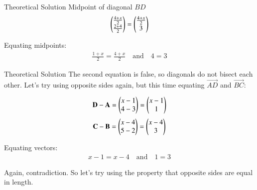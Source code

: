 \documentclass{beamer}
\begin{document}
\begin{frame}{Theoretical Solution}
Midpoint of diagonal $BD$
\begin{align}
\begin{pmatrix}\frac{4 + x}{2} \\ \frac{2 + 4}{2} \end{pmatrix} = \begin{pmatrix} \frac{4 + x}{2}\\ 3 \end{pmatrix}
\end{align}

Equating midpoints:
\begin{align}
\frac{1 + x}{2} = \frac{4 + x}{2} \quad \text{and} \quad 4 = 3
\end{align}
\end{frame}
\begin{frame}{Theoretical Solution}
The second equation is false, so diagonals do not bisect each other. Let's try using opposite sides again, but this time equating $ \vec{AD} $ and $ \vec{BC} $:

\begin{align}
\vec{D} -\vec{A} = \begin{myvec}
    {x-1 \\ 4-3 } \end{myvec} =\begin{myvec}
        {x-1 \\ 1}
    \end{myvec}
 \end{align}   
 \begin{align}
\vec{C} -\vec{B} = \begin{myvec}
    {x - 4 \\ 5 - 2} \end{myvec} =\begin{myvec}
         {x - 4 \\ 3}
     \end{myvec}
\end{align}

Equating vectors:
\begin{align}
x - 1 = x - 4 \quad \text{and} \quad 1 = 3
\end{align}

Again, contradiction. So let's try using the property that opposite sides are equal in length.
\end{frame}
\end{document}
